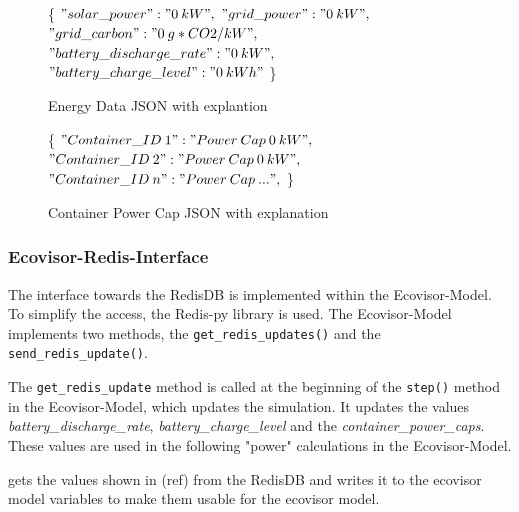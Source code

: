 



\begin{figure}
	\removelatexerror
	\begin{algorithm}[H]
		\caption{Energy Data JSON with explantion}
		\label{alg:energy_JSON}
		\{\;
			$"solar\_power" : "0\: kW",$\;
			$"grid\_power" : "0\: kW",$\;
			$"grid\_carbon" : "0\: g*CO2/kW",$\;
			$"battery\_discharge\_rate" : "0\: kW",$\;
			$"battery\_charge\_level" : "0\: kWh"$\;
		\}
		\vspace{3mm}
	\end{algorithm}
\end{figure}

\begin{figure}
	\removelatexerror
	\begin{algorithm}[H]
		\caption{Container Power Cap JSON with explanation}
		\label{alg:container_JSON}
		\{\;
		$"Container\_ID\: 1" : "Power\: Cap\: 0\: kW",$\;
		$"Container\_ID\: 2" : "Power\: Cap\: 0\: kW",$\;
		$"Container\_ID\: n" : "Power\: Cap\: ...",$\;
		\}
		\vspace{3mm}
	\end{algorithm}
\end{figure}

\subsubsection{Ecovisor-Redis-Interface}
The interface towards the RedisDB is implemented within the Ecovisor-Model. To simplify the access, the Redis-py library \cite{Redis-py} is used. The Ecovisor-Model implements two methods, the
\texttt{get\_redis\_updates()} and the \texttt{send\_redis\_update()}.

The \texttt{get\_redis\_update} method is called at the beginning of the \texttt{step()} method in the Ecovisor-Model, which updates the simulation. It updates the values \textit{battery\_discharge\_rate},
\textit{battery\_charge\_level} and the \textit{container\_power\_caps}. These values are used in the following "power" calculations in the Ecovisor-Model.

gets the values shown in (ref) from the RedisDB %
and writes it to the ecovisor model variables to make them usable for the ecovisor model.

